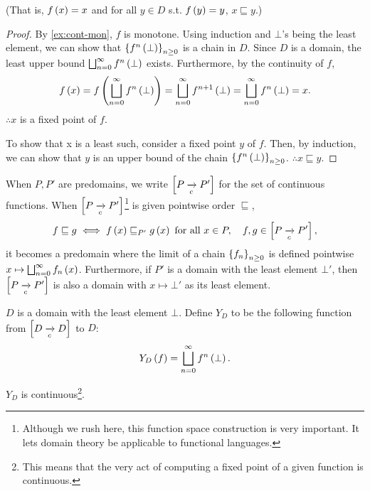\begin{enumcirc}
\begin{property}
		(That is, $f \left( x \right) = x$ and for all $y \in D$ s.t. $f \left( y \right) = y$, $x \sqsubseteq y$.)
	\end{property}
	\begin{proof}
		By \cref{ex:cont-mon}, $f$ is monotone.
		Using induction and $\bot$'s being the least element, we can show that
		$\left\{ f^n \left( \bot \right) \right\}_{n \geq 0}$ is a chain in $D$.
		Since $D$ is a domain, the least upper bound
		$\bigsqcup_{n = 0}^{\infty} f^n \left( \bot \right)$ exists.
		Furthermore, by the continuity of $f$,
		\[
			f \left( x \right) =
			f \left( \bigsqcup_{n = 0}^{\infty} f^n \left( \bot \right) \right) =
			\bigsqcup_{n = 0}^{\infty} f^{n + 1} \left( \bot \right) =
			\bigsqcup_{n = 0}^{\infty} f^n \left( \bot \right) =
			x.
		\]
		$\therefore x$ is a fixed point of $f$.

		To show that x is a least such, consider a fixed point $y$ of $f$.
		Then, by induction, we can show that $y$ is an upper bound of the chain
		$\left\{ f^n \left( \bot \right) \right\}_{n \geq 0}$.
		$\therefore x \sqsubseteq y$.
	\end{proof}
	\item
	When $P, P'$ are predomains, we write $\left[ P \xrightarrow[c]{} P' \right]$ for the set of
	continuous functions.
	When $\left[ P \xrightarrow[c]{} P' \right]$\footnote{
		\begin{minipage}{0.9\textwidth}
			Although we rush here, this function space construction is very important.
			It lets domain theory be applicable to functional languages.
		\end{minipage}
	} is given pointwise order
	$\sqsubseteq$,
	\[
		f \sqsubseteq g \iff f \left( x \right) \sqsubseteq_{P'} g \left( x \right)
		\textrm{ for all } x \in P, \quad f, g \in \left[ P \xrightarrow[c]{} P' \right],
	\]
	it becomes a predomain where the limit of a chain $\left\{ f_n \right\}_{n \geq 0}$ is
	defined pointwise $x \mapsto \bigsqcup_{n = 0}^\infty f_n \left( x \right)$.
	Furthermore, if $P'$ is a domain with the least element $\bot'$, then
	$\left[ P \xrightarrow[c]{} P' \right]$ is also a domain with $x \mapsto \bot'$ as its least
	element.
	\item
	$D$ is a domain with the least element $\bot$.
	Define $Y_D$ to be the following function from $\left[ D \xrightarrow[c]{} D \right]$ to $D$:
	\[
		Y_D \left( f \right) = \bigsqcup_{n = 0}^{\infty} f^n \left( \bot \right).
	\]
	\begin{lemma}
		$Y_D$ is continuous\footnote{%
			This means that the very act of computing a fixed point of a given function is continuous.%
		}.
	\end{lemma}

\end{enumcirc}
